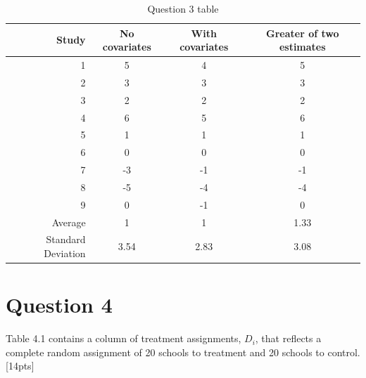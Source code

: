 \documentclass[11pt,notitlepage]{article}\usepackage[]{graphicx}\usepackage[]{color}
\begin{document}
\begin{table}[H]
  \centering
  \caption{Question 3 table}
    \begin{tabular}{r|cc|c}
    \toprule
   \multicolumn{1}{r}{Study} & No covariates & \multicolumn{1}{c}{With covariates} & \multicolumn{1}{c}{Greater of two estimates} \\
    \midrule
    1     & 5     & 4     & 5 \\
    2     & 3     & 3     & 3 \\
    3     & 2     & 2     & 2 \\
    4     & 6     & 5     & 6 \\
    5     & 1     & 1     & 1 \\
    6     & 0     & 0     & 0 \\
    7     & -3    & -1    & -1 \\
    8     & -5    & -4    & -4 \\
    9     & 0     & -1    & 0 \\ \midrule
    Average & 1     & 1     & 1.33 \\
    Standard Deviation & 3.54  & 2.83  & 3.08 \\
    \bottomrule
    \end{tabular}%
  \label{tab:addlabel}%
\end{table}%

\section*{Question 4}


Table 4.1 contains a column of treatment assignments, $D_i$, that reflects a complete random assignment of 20 schools to treatment and 20 schools to control. [14pts]
\end{document}
